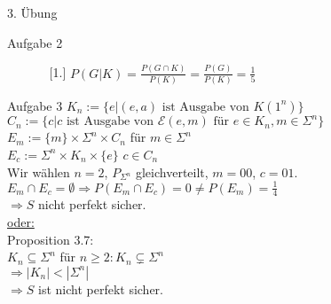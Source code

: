 \begin{section}{3. Übung}
\begin{subsection}{Aufgabe 2}
\begin{enumerate}[a)]
\begin{enumerate} [1.]
   $P(G|K) = \frac{P(G \cap K)}{P(K)} = \frac{P(G)}{P(K)} = \frac{1}{5}$
  \end{enumerate}
 \end{enumerate}
 \end{subsection}
 \begin{subsection}{Aufgabe 3}
  $K_n := \{e|(e,a)\text{ ist Ausgabe von } K(1^n)\}$\\
  $C_n := \{c|c\text{ ist Ausgabe von }\mathcal{E}(e,m)\text{ für } e \in K_n, m \in \Sigma^n\}$\\
  $E_m := \{m\} \times \Sigma^n \times C_n$ für $ m\in \Sigma^n$\\
  $E_c := \Sigma^n \times K_n \times \{e\}$  $c \in C_n$\\
  Wir wählen $n=2$, $ P_{\Sigma^n}$ gleichverteilt, $m=00$, $c=01$.\\
  $E_m \cap E_c = \emptyset \Rightarrow P(E_m \cap E_c) = 0 \neq P(E_m) = \frac{1}{4}$\\
  $\Rightarrow S$ nicht perfekt sicher.\\
  \underline{oder:}\\
  Proposition 3.7: \\
  $K_n \subseteq \Sigma^n$ für $ n \geq 2: K_n \subsetneq \Sigma^n$\\
  $\Rightarrow |K_n| < |\Sigma^n|$\\
  $\Rightarrow S$ ist nicht perfekt sicher.
 \end{subsection}

 
\end{section}
